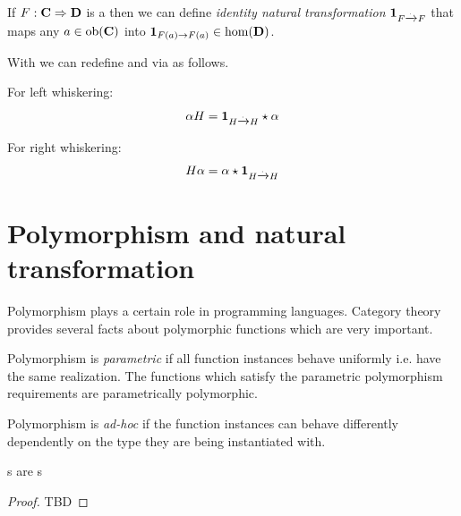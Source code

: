 \begin{definition}
\label{def:idnt}
If $F: \mathbf{C} \Rightarrow \mathbf{D}$ is a  then we can
define \textit{identity natural transformation}
$\mathbf{1}_{ F \xrightarrow{.} F }$ that maps any  
$a \in \mathrm{ob}(\mathbf{C})$ into  $\mathbf{1}_{ F(a) \to F(a) } \in \mathrm{hom}(\mathbf{D})$.
\end{definition}

\begin{remark}[Whiskering]
\label{rem:whiskering}
With  we can redefine  and
 via  as follows.

For left whiskering:
\begin{equation}
\label{eq:lw}
\alpha H = \mathbf{1}_{ H \xrightarrow{.} H } \star \alpha
\end{equation}

For right whiskering:
\begin{equation}
\label{eq:rw}
H \alpha = \alpha \star \mathbf{1}_{ H \xrightarrow{.} H }
\end{equation}
\end{remark}


\section{Polymorphism and natural transformation}

Polymorphism plays a certain role in programming languages. Category
theory provides several facts about polymorphic functions which are
very important.

\begin{definition}
\label{def:pp_function}
Polymorphism is \textit{parametric} if all function instances behave uniformly
i.e. have the same realization. The functions which satisfy the
parametric polymorphism requirements are parametrically polymorphic.
\end{definition}

\begin{definition}
\label{def:ad_hoc_polymorphism}
Polymorphism is \textit{ad-hoc} if the function instances can behave
differently dependently on the type they are being instantiated with. 
\end{definition}

\begin{theorem}[Reynolds]
\label{thm:reynolds}
s are s 
\begin{proof}
TBD
\end{proof}
\end{theorem}

